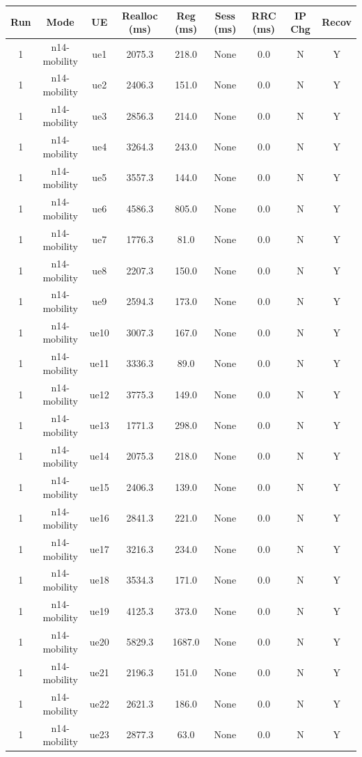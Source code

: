 \begin{table}[ht]
\centering
\begin{tabular}{|c|c|c|c|c|c|c|c|c|}
\hline
Run & Mode & UE & Realloc (ms) & Reg (ms) & Sess (ms) & RRC (ms) & IP Chg & Recov \\
\hline
1 & n14-mobility & ue1 & 2075.3 & 218.0 & None & 0.0 & N & Y \\
1 & n14-mobility & ue2 & 2406.3 & 151.0 & None & 0.0 & N & Y \\
1 & n14-mobility & ue3 & 2856.3 & 214.0 & None & 0.0 & N & Y \\
1 & n14-mobility & ue4 & 3264.3 & 243.0 & None & 0.0 & N & Y \\
1 & n14-mobility & ue5 & 3557.3 & 144.0 & None & 0.0 & N & Y \\
1 & n14-mobility & ue6 & 4586.3 & 805.0 & None & 0.0 & N & Y \\
1 & n14-mobility & ue7 & 1776.3 & 81.0 & None & 0.0 & N & Y \\
1 & n14-mobility & ue8 & 2207.3 & 150.0 & None & 0.0 & N & Y \\
1 & n14-mobility & ue9 & 2594.3 & 173.0 & None & 0.0 & N & Y \\
1 & n14-mobility & ue10 & 3007.3 & 167.0 & None & 0.0 & N & Y \\
1 & n14-mobility & ue11 & 3336.3 & 89.0 & None & 0.0 & N & Y \\
1 & n14-mobility & ue12 & 3775.3 & 149.0 & None & 0.0 & N & Y \\
1 & n14-mobility & ue13 & 1771.3 & 298.0 & None & 0.0 & N & Y \\
1 & n14-mobility & ue14 & 2075.3 & 218.0 & None & 0.0 & N & Y \\
1 & n14-mobility & ue15 & 2406.3 & 139.0 & None & 0.0 & N & Y \\
1 & n14-mobility & ue16 & 2841.3 & 221.0 & None & 0.0 & N & Y \\
1 & n14-mobility & ue17 & 3216.3 & 234.0 & None & 0.0 & N & Y \\
1 & n14-mobility & ue18 & 3534.3 & 171.0 & None & 0.0 & N & Y \\
1 & n14-mobility & ue19 & 4125.3 & 373.0 & None & 0.0 & N & Y \\
1 & n14-mobility & ue20 & 5829.3 & 1687.0 & None & 0.0 & N & Y \\
1 & n14-mobility & ue21 & 2196.3 & 151.0 & None & 0.0 & N & Y \\
1 & n14-mobility & ue22 & 2621.3 & 186.0 & None & 0.0 & N & Y \\
1 & n14-mobility & ue23 & 2877.3 & 63.0 & None & 0.0 & N & Y \\

\end{tabular}
\end{table}
